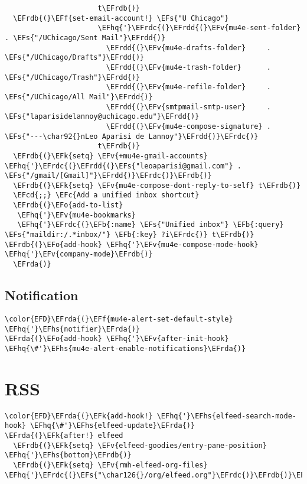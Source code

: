 \documentclass[c]{article}
\theoremstyle{plain}%
\theoremstyle{definition}
\theoremstyle{remark}
\newcommand{\EFc}[1]{\textcolor{EFc}{#1}} %
\newcommand{\EFcd}[1]{\textcolor{EFcd}{#1}} %
\newcommand{\EFs}[1]{\textcolor{EFs}{#1}} %
\newcommand{\EFk}[1]{\textcolor{EFk}{#1}} %
\newcommand{\EFb}[1]{\textcolor{EFb}{#1}} %
\newcommand{\EFf}[1]{\textcolor{EFf}{#1}} %
\newcommand{\EFv}[1]{\textcolor{EFv}{#1}} %
\newcommand{\EFo}[1]{\textcolor{EFo}{#1}} %
\newcommand{\EFhq}[1]{\textcolor{EFhq}{#1}} %
\newcommand{\EFhs}[1]{\textcolor{EFhs}{#1}} %
\newcommand{\EFrda}[1]{\textcolor{EFrda}{#1}} %
\newcommand{\EFrdb}[1]{\textcolor{EFrdb}{#1}} %
\newcommand{\EFrdc}[1]{\textcolor{EFrdc}{#1}} %
\newcommand{\EFrdd}[1]{\textcolor{EFrdd}{#1}} %
\begin{document}
\begin{Code}
\begin{Verbatim}
                      t\EFrdb{)}
  \EFrdb{(}\EFf{set-email-account!} \EFs{"U Chicago"}
                      \EFhq{'}\EFrdc{(}\EFrdd{(}\EFv{mu4e-sent-folder}       . \EFs{"/UChicago/Sent Mail"}\EFrdd{)}
                        \EFrdd{(}\EFv{mu4e-drafts-folder}     . \EFs{"/UChicago/Drafts"}\EFrdd{)}
                        \EFrdd{(}\EFv{mu4e-trash-folder}      . \EFs{"/UChicago/Trash"}\EFrdd{)}
                        \EFrdd{(}\EFv{mu4e-refile-folder}     . \EFs{"/UChicago/All Mail"}\EFrdd{)}
                        \EFrdd{(}\EFv{smtpmail-smtp-user}     . \EFs{"laparisidelannoy@uchicago.edu"}\EFrdd{)}
                        \EFrdd{(}\EFv{mu4e-compose-signature} . \EFs{"---\char92{}nLeo Aparisi de Lannoy"}\EFrdd{)}\EFrdc{)}
                      t\EFrdb{)}
  \EFrdb{(}\EFk{setq} \EFv{+mu4e-gmail-accounts} \EFhq{'}\EFrdc{(}\EFrdd{(}\EFs{"leoaparisi@gmail.com"} . \EFs{"/gmail/[Gmail]"}\EFrdd{)}\EFrdc{)}\EFrdb{)}
  \EFrdb{(}\EFk{setq} \EFv{mu4e-compose-dont-reply-to-self} t\EFrdb{)}
  \EFcd{;;} \EFc{Add a unified inbox shortcut}
  \EFrdb{(}\EFo{add-to-list}
   \EFhq{'}\EFv{mu4e-bookmarks}
   \EFhq{'}\EFrdc{(}\EFb{:name} \EFs{"Unified inbox"} \EFb{:query} \EFs{"maildir:/.*inbox/"} \EFb{:key} ?i\EFrdc{)} t\EFrdb{)}
\EFrdb{(}\EFo{add-hook} \EFhq{'}\EFv{mu4e-compose-mode-hook} \EFhq{'}\EFv{company-mode}\EFrdb{)}
  \EFrda{)}
\end{Verbatim}
\end{Code}
\subsection{Notification}
\label{sec:org064bae4}
\begin{Code}
\begin{Verbatim}
\color{EFD}\EFrda{(}\EFf{mu4e-alert-set-default-style} \EFhq{'}\EFhs{notifier}\EFrda{)}
\EFrda{(}\EFo{add-hook} \EFhq{'}\EFv{after-init-hook} \EFhq{\#'}\EFhs{mu4e-alert-enable-notifications}\EFrda{)}
\end{Verbatim}
\end{Code}
\section{RSS}
\label{sec:org9f61513}
\begin{Code}
\begin{Verbatim}
\color{EFD}\EFrda{(}\EFk{add-hook!} \EFhq{'}\EFhs{elfeed-search-mode-hook} \EFhq{\#'}\EFhs{elfeed-update}\EFrda{)}
\EFrda{(}\EFk{after!} elfeed
  \EFrdb{(}\EFk{setq} \EFv{elfeed-goodies/entry-pane-position} \EFhq{'}\EFhs{bottom}\EFrdb{)}
  \EFrdb{(}\EFk{setq} \EFv{rmh-elfeed-org-files} \EFhq{'}\EFrdc{(}\EFs{"\char126{}/org/elfeed.org"}\EFrdc{)}\EFrdb{)}\EFrda{)}
\end{Verbatim}
\end{Code}
\end{document}
